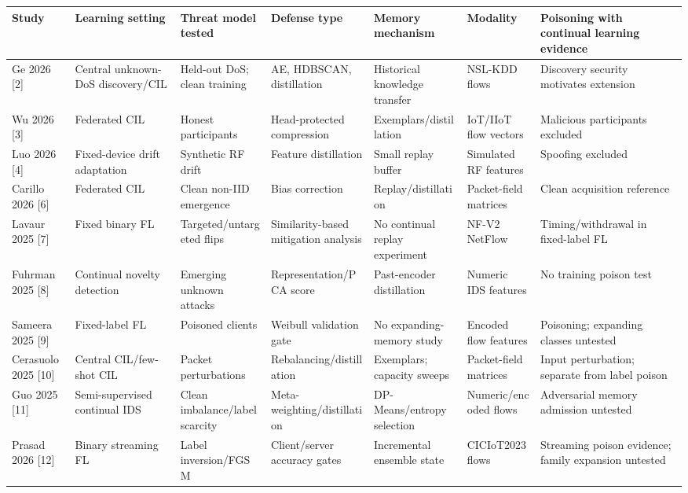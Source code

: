 \documentclass[10pt,a4paper]{article}
\begin{document}
\begin{longtable}{p{2.4cm}l l l l l l}
\toprule
Study & Learning setting & Threat model tested & Defense type & Memory mechanism & Modality & Poisoning with continual learning evidence\\
\midrule
Ge 2026 [2] & Central unknown-DoS discovery/CIL & Held-out DoS; clean training & AE, HDBSCAN, distillation & Historical knowledge transfer & NSL-KDD flows & Discovery security motivates extension\\
Wu 2026 [3] & Federated CIL & Honest participants & Head-protected compression & Exemplars/distillation & IoT/IIoT flow vectors & Malicious participants excluded\\
Luo 2026 [4] & Fixed-device drift adaptation & Synthetic RF drift & Feature distillation & Small replay buffer & Simulated RF features & Spoofing excluded\\
Carillo 2026 [6] & Federated CIL & Clean non-IID emergence & Bias correction & Replay/distillation & Packet-field matrices & Clean acquisition reference\\
Lavaur 2025 [7] & Fixed binary FL & Targeted/untargeted flips & Similarity-based mitigation analysis & No continual replay experiment & NF-V2 NetFlow & Timing/withdrawal in fixed-label FL\\
Fuhrman 2025 [8] & Continual novelty detection & Emerging unknown attacks & Representation/PCA score & Past-encoder distillation & Numeric IDS features & No training poison test\\
Sameera 2025 [9] & Fixed-label FL & Poisoned clients & Weibull validation gate & No expanding-memory study & Encoded flow features & Poisoning; expanding classes untested\\
Cerasuolo 2025 [10] & Central CIL/few-shot CIL & Packet perturbations & Rebalancing/distillation & Exemplars; capacity sweeps & Packet-field matrices & Input perturbation; separate from label poison\\
Guo 2025 [11] & Semi-supervised continual IDS & Clean imbalance/label scarcity & Meta-weighting/distillation & DP-Means/entropy selection & Numeric/encoded flows & Adversarial memory admission untested\\
Prasad 2026 [12] & Binary streaming FL & Label inversion/FGSM & Client/server accuracy gates & Incremental ensemble state & CICIoT2023 flows & Streaming poison evidence; family expansion untested\\
\bottomrule
\end{longtable}
\end{document}
